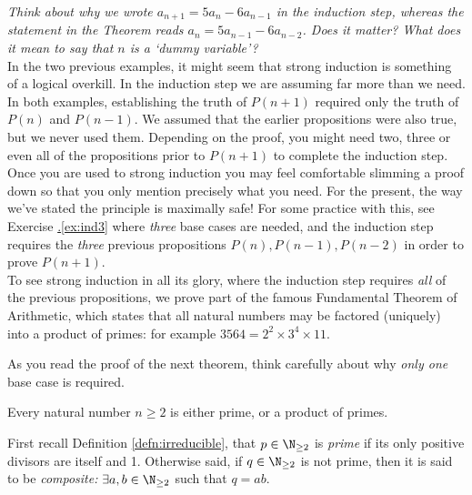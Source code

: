 \noindent\emph{Think about why we wrote $a_{n+1}=5a_n-6a_{n-1}$ in the induction step, whereas the statement in the Theorem reads $a_n=5a_{n-1}-6a_{n-2}$. Does it matter? What does it mean to say that $n$ is a `dummy variable'?}\\

In the two previous examples, it might seem that strong induction is something of a logical overkill. In the induction step we are assuming far more than we need. In both examples, establishing the truth of $P(n+1)$ required only the truth of $P(n)$ and $P(n-1)$. We assumed that the earlier propositions were also true, but we never used them. Depending on the proof, you might need two, three or even all of the propositions prior to $P(n+1)$ to complete the induction step. Once you are used to strong induction you may feel comfortable slimming a proof down so that you only mention precisely what you need. For the present, the way we've stated the principle is maximally safe! For some practice with this, see Exercise \hyperref[ex:ind3]{\thesubsection.\ref*{ex:ind3}} where \emph{three} base cases are needed, and the induction step requires the \emph{three} previous propositions $P(n),P(n-1),P(n-2)$ in order to prove $P(n+1)$.\\

To see strong induction in all its glory, where the induction step requires \emph{all} of the previous propositions, we prove part of the famous Fundamental Theorem of Arithmetic, which states that all natural numbers may be factored (uniquely) into a product of primes: for example $3564=2^2\times 3^4\times 11$.\goodbreak


\noindent As you read the proof of the next theorem, think carefully about why \emph{only one} base case is required.

\begin{thm}\label{thm:fundarith}
Every natural number $n\ge 2$ is either prime, or a product of primes.
\end{thm}

First recall Definition \ref{defn:irreducible}, that $p\in\N_{\ge 2}$ is \emph{prime} if its only positive divisors are itself and 1. Otherwise said, if $q\in\N_{\ge 2}$ is not prime, then it is said to be \emph{composite:} $\exists a,b\in\N_{\ge 2}$ such that $q=ab$.

